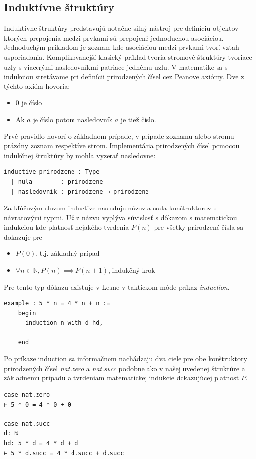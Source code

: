 \documentclass[a4paper,10pt,oneside]{report}%
\begin{document}
\subsection{Induktívne štruktúry}

    Induktívne štruktúry predstavujú notačne silný nástroj pre definíciu objektov
ktorých prepojenia medzi prvkami sú prepojené jednoduchou asociáciou.
    Jednoduchým príkladom je zoznam kde asociáciou medzi prvkami tvorí vzťah
usporiadania.
    Komplikovanejší klasický príklad tvoria stromové štruktúry tvoriace uzly
s viacerými nasledovníkmi patriace jednému uzlu.
    V matematike sa s indukciou stretávame pri definícii prirodzených čísel
cez Peanove axiómy.
    Dve z týchto axióm hovoria:
\begin{itemize}
    \item 0 je číslo
    \item Ak $a$ je číslo potom nasledovník $a$ je tiež číslo.
\end{itemize}
    Prvé pravidlo hovorí o základnom prípade, v prípade zoznamu alebo stromu prázdny
zoznam respektíve strom.
    Implementácia prirodzených čísel pomocou indukčnej štruktúry by mohla vyzerať
nasledovne:
\begin{lstlisting}
inductive prirodzene : Type
  | nula        : prirodzene
  | nasledovnik : prirodzene → prirodzene
\end{lstlisting}
    Za kľúčovým slovom inductive nasleduje názov a sada konštruktorov s návratovými
typmi.
    Už z názvu vyplýva súvislosť s dôkazom s matematickou indukciou kde platnosť
nejakého tvrdenia $P(n)$ pre všetky prirodzené čísla sa dokazuje pre
\begin{itemize}
    \item $P(0)$, t.j. základný prípad
    \item $\forall n \in \mathbb{N}, P(n) \implies P(n+1)$, indukčný krok
\end{itemize}
    Pre tento typ dôkazu existuje v Leane v taktickom móde príkaz \emph{induction}.
\begin{lstlisting}
example : 5 * n = 4 * n + n :=
    begin
      induction n with d hd,
      ...
    end
\end{lstlisting}
    Po príkaze induction sa informačnom nachádzaju dva ciele pre obe konštruktory
prirodzených čísel \emph{nat.zero} a \emph{nat.succ} podobne ako v našej uvedenej
štruktúre a základnemu prípadu a tvrdeniam matematickej indukcie dokazujúcej platnosť
$P$.
\begin{lstlisting}
case nat.zero
⊢ 5 * 0 = 4 * 0 + 0

case nat.succ
d: ℕ
hd: 5 * d = 4 * d + d
⊢ 5 * d.succ = 4 * d.succ + d.succ
\end{lstlisting}
\end{document}
